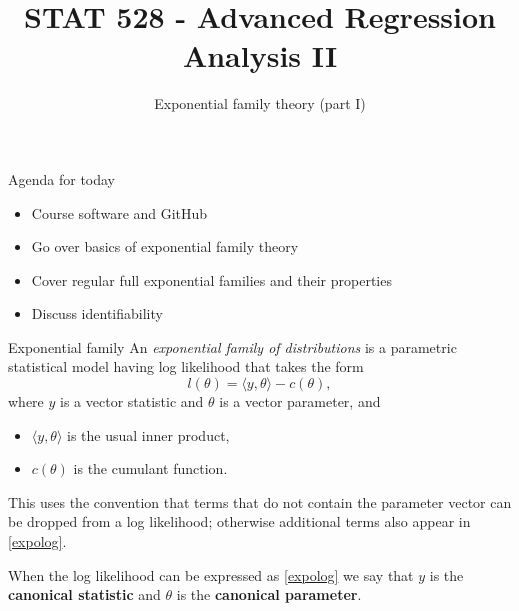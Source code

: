\documentclass[
  ignorenonframetext,
]{beamer}
\title{STAT 528 - Advanced Regression Analysis II}
\author{Exponential family theory (part I)}
\date{}
\institute{Daniel J. Eck\\
Department of Statistics\\
University of Illinois}
\providecommand{\tightlist}{%
  \setlength{\itemsep}{0pt}\setlength{\parskip}{0pt}}
\begin{document}
\frame{\titlepage}

\begin{frame}
\newcommand{\R}{\mathbb{R}}
\newcommand{\Prob}{\mathbb{P}}
\newcommand{\Proj}{\textbf{P}}
\newcommand{\Hcal}{\mathcal{H}}
\newcommand{\rootn}{\sqrt{n}}
\newcommand{\p}{\mathbf{p}}
\newcommand{\E}{\text{E}}
\newcommand{\Var}{\text{Var}}
\newcommand{\Cov}{\text{Cov}}

\newtheorem{cor}{Corollary}
\newtheorem{lem}{Lemma}
\newtheorem{thm}{Theorem}
\newtheorem{defn}{Definition}
\newtheorem{prop}{Proposition}
\end{frame}

\begin{frame}{Agenda for today}
\protect\hypertarget{agenda-for-today}{}
\begin{itemize}
\tightlist
\item
  Course software and GitHub
\item
  Go over basics of exponential family theory
\item
  Cover regular full exponential families and their properties
\item
  Discuss identifiability
\end{itemize}
\end{frame}

\begin{frame}{Exponential family}
\protect\hypertarget{exponential-family}{}
An \emph{exponential family of distributions} is a parametric
statistical model having log likelihood that takes the form
\begin{equation} \label{expolog}
    l(\theta) = \langle y,\theta \rangle - c(\theta),
\end{equation} where \(y\) is a vector statistic and \(\theta\) is a
vector parameter, and

\begin{itemize}
\tightlist
\item
  \(\langle y,\theta \rangle\) is the usual inner product,
\item
  \(c(\theta)\) is the cumulant function.
\end{itemize}

This uses the convention that terms that do not contain the parameter
vector can be dropped from a log likelihood; otherwise additional terms
also appear in \eqref{expolog}.

When the log likelihood can be expressed as \eqref{expolog} we say that
\(y\) is the \textbf{canonical statistic} and \(\theta\) is the
\textbf{canonical parameter}.
\end{frame}
\end{document}
